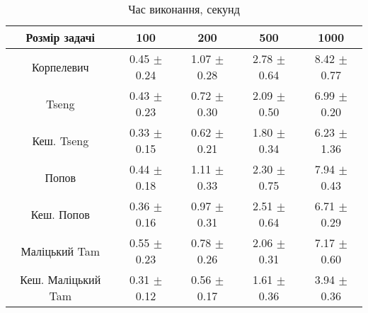 \begin{table}[H]
	\centering
	\begin{tabular}{|c||c|c|c|c|}\hline
		Розмір задачі & 100 & 200 & 500 & 1000 \\ \hline \hline
		Корпелевич & 0.45 $\pm$ 0.24 & 1.07 $\pm$ 0.28 & 2.78 $\pm$ 0.64 & 8.42 $\pm$ 0.77 \\ \hline
		Tseng & 0.43 $\pm$ 0.23 & 0.72 $\pm$ 0.30 & 2.09 $\pm$ 0.50 & 6.99 $\pm$ 0.20 \\ \hline
		Кеш. Tseng & 0.33 $\pm$ 0.15 & 0.62 $\pm$ 0.21 & 1.80 $\pm$ 0.34 & 6.23 $\pm$ 1.36 \\ \hline
		Попов & 0.44 $\pm$ 0.18 & 1.11 $\pm$ 0.33 & 2.30 $\pm$ 0.75 & 7.94 $\pm$ 0.43 \\ \hline
		Кеш. Попов & 0.36 $\pm$ 0.16 & 0.97 $\pm$ 0.31 & 2.51 $\pm$ 0.64 & 6.71 $\pm$ 0.29 \\ \hline
		Маліцький Tam & 0.55 $\pm$ 0.23 & 0.78 $\pm$ 0.26 & 2.06 $\pm$ 0.31 & 7.17 $\pm$ 0.60 \\ \hline
		Кеш. Маліцький Tam & 0.31 $\pm$ 0.12 & 0.56 $\pm$ 0.17 & 1.61 $\pm$ 0.36 & 3.94 $\pm$ 0.36 \\ \hline
	\end{tabular}
	\caption{Час виконання, секунд}
\end{table}
